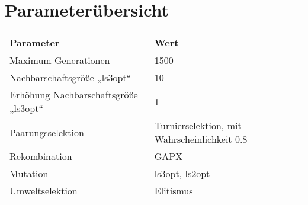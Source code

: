 \section{Parameterübersicht}
\begin{tabular}{l|p{5.4cm}}
  \textbf{Parameter} & \textbf{Wert} \\
  \hline
  Maximum Generationen & 1500 \\
  \hline
  Nachbarschaftsgröße „ls3opt“ & 10 \\
  \hline
  Erhöhung Nachbarschaftsgröße „ls3opt“ & 1 \\
  \hline
  Paarungsselektion & Turnierselektion, \newline mit Wahrscheinlichkeit 0.8 \\
  \hline
  Rekombination & GAPX\\
  \hline
  Mutation & ls3opt, ls2opt\\
  \hline
  Umweltselektion & Elitismus \\
  \hline
\end{tabular}
